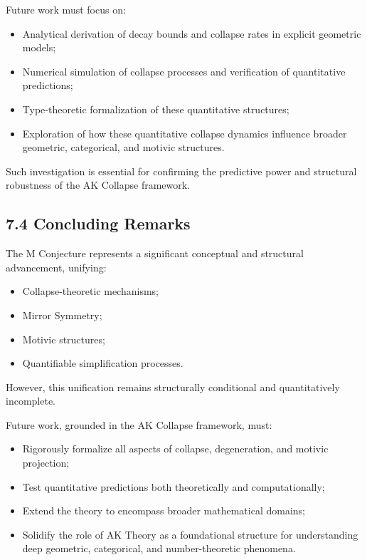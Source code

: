 \documentclass[11pt]{article}
\begin{document}
Future work must focus on:

\begin{itemize}
    \item Analytical derivation of decay bounds and collapse rates in explicit geometric models;
    \item Numerical simulation of collapse processes and verification of quantitative predictions;
    \item Type-theoretic formalization of these quantitative structures;
    \item Exploration of how these quantitative collapse dynamics influence broader geometric, categorical, and motivic structures.
\end{itemize}

Such investigation is essential for confirming the predictive power and structural robustness of the AK Collapse framework.

\subsection{7.4 Concluding Remarks}

The M Conjecture represents a significant conceptual and structural advancement, unifying:

\begin{itemize}
    \item Collapse-theoretic mechanisms;
    \item Mirror Symmetry;
    \item Motivic structures;
    \item Quantifiable simplification processes.
\end{itemize}

However, this unification remains structurally conditional and quantitatively incomplete.

Future work, grounded in the AK Collapse framework, must:

\begin{itemize}
    \item Rigorously formalize all aspects of collapse, degeneration, and motivic projection;
    \item Test quantitative predictions both theoretically and computationally;
    \item Extend the theory to encompass broader mathematical domains;
    \item Solidify the role of AK Theory as a foundational structure for understanding deep geometric, categorical, and number-theoretic phenomena.
\end{itemize}
\end{document}
